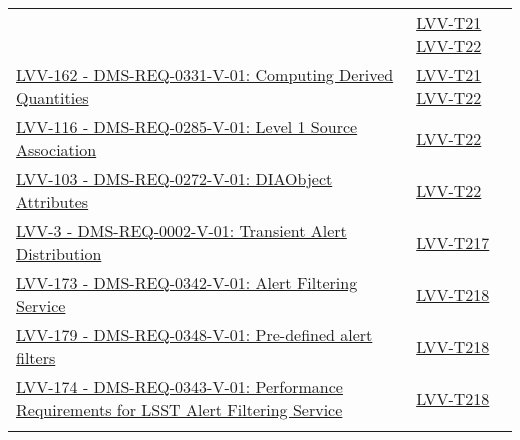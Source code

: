 {\begin{longtable}[]{p{13cm}p{3cm}}
& {
\hyperref[lvv-t21]{LVV-T21}
\hyperref[lvv-t22]{LVV-T22}
} \\
\href{https://jira.lsstcorp.org/browse/LVV-162}{LVV-162 - DMS-REQ-0331-V-01: Computing Derived Quantities}
& {
\hyperref[lvv-t21]{LVV-T21}
\hyperref[lvv-t22]{LVV-T22}
} \\
\href{https://jira.lsstcorp.org/browse/LVV-116}{LVV-116 - DMS-REQ-0285-V-01: Level 1 Source Association}
& {
\hyperref[lvv-t22]{LVV-T22}
} \\
\href{https://jira.lsstcorp.org/browse/LVV-103}{LVV-103 - DMS-REQ-0272-V-01: DIAObject Attributes}
& {
\hyperref[lvv-t22]{LVV-T22}
} \\
\href{https://jira.lsstcorp.org/browse/LVV-3}{LVV-3 - DMS-REQ-0002-V-01: Transient Alert Distribution}
& {
\hyperref[lvv-t217]{LVV-T217}
} \\
\href{https://jira.lsstcorp.org/browse/LVV-173}{LVV-173 - DMS-REQ-0342-V-01: Alert Filtering Service}
& {
\hyperref[lvv-t218]{LVV-T218}
} \\
\href{https://jira.lsstcorp.org/browse/LVV-179}{LVV-179 - DMS-REQ-0348-V-01: Pre-defined alert filters}
& {
\hyperref[lvv-t218]{LVV-T218}
} \\
\href{https://jira.lsstcorp.org/browse/LVV-174}{LVV-174 - DMS-REQ-0343-V-01: Performance Requirements for LSST Alert Filtering Service}
& {
\hyperref[lvv-t218]{LVV-T218}
} \\
\tabularnewline
\bottomrule
\end{longtable}
} %
